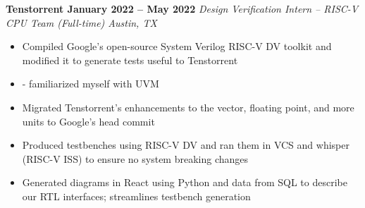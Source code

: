 \documentclass[../main.tex]{subfiles}
\begin{document}
%
\noindent\textbf{{\fontsize{\textFontSize}{\textFontBox}\selectfont Tenstorrent \hfill January 2022 – May 2022}}
\vspace{\jobHeaderDist}\newline
%
{\fontsize{\textFontSize}{\textFontBox}\selectfont\emph{Design Verification Intern – RISC-V CPU Team (Full-time) \hfill Austin, TX \hspace{0 cm}}}\newline
\vspace{\listHeight}
%
%
\begin{itemize}
  \setlength{\itemindent}{-6mm}
  \vspace{\listItemDist}\item {\fontsize{\textFontSize}{\textFontBox}\selectfont Compiled Google’s open-source System Verilog RISC-V DV toolkit and modified it to generate tests useful to Tenstorrent}
  \vspace{\listItemDistTwo}\item {\fontsize{\textFontSize}{\textFontBox}\selectfont - familiarized myself with UVM}
  \vspace{\listItemDistTwo}\item {\fontsize{\textFontSize}{\textFontBox}\selectfont Migrated Tenstorrent’s enhancements to the vector, floating point, and more units to Google’s head commit}
  \vspace{\listItemDistTwo}\item {\fontsize{\textFontSize}{\textFontBox}\selectfont Produced testbenches using RISC-V DV and ran them in VCS and whisper (RISC-V ISS) to ensure no system breaking changes}
  \vspace{-6 mm}\item {\fontsize{\textFontSize}{\textFontBox}\selectfont Generated diagrams in React using Python and data from SQL to describe our RTL interfaces; streamlines testbench generation}
\end{itemize}
%
%
\vspace{-\topsep}
%
\end{document}
